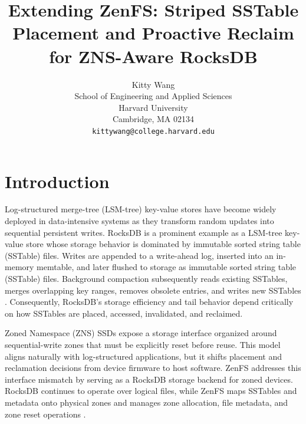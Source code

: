 \documentclass[letterpaper,twocolumn,10pt]{article}
\begin{document}

\date{}

\title{\Large \bf Extending ZenFS: Striped SSTable Placement and Proactive Reclaim for ZNS-Aware RocksDB}

\author{
{\rm Kitty Wang}\\
School of Engineering and Applied Sciences\\
  Harvard University\\
  Cambridge, MA 02134 \\
  \texttt{kittywang@college.harvard.edu} \\
} %

\maketitle


\section{Introduction}
Log-structured merge-tree (LSM-tree) key-value stores have become widely deployed in data-intensive systems as they transform random updates into sequential persistent writes. RocksDB is a prominent example as a LSM-tree key-value store whose storage behavior is dominated by immutable sorted string table (SSTable) files. Writes are appended to a write-ahead log, inserted into an in-memory memtable, and later flushed to storage as immutable sorted string table (SSTable) files. Background compaction subsequently reads existing SSTables, merges overlapping key ranges, removes obsolete entries, and writes new SSTables \cite{dong2021rocksdb}. Consequently, RocksDB's storage efficiency and tail behavior depend critically on how SSTables are placed, accessed, invalidated, and reclaimed.

Zoned Namespace (ZNS) SSDs expose a storage interface organized around sequential-write zones that must be explicitly reset before reuse. This model aligns naturally with log-structured applications, but it shifts placement and reclamation decisions from device firmware to host software. ZenFS addresses this interface mismatch by serving as a RocksDB storage backend for zoned devices. RocksDB continues to operate over logical files, while ZenFS maps SSTables and metadata onto physical zones and manages zone allocation, file metadata, and zone reset operations \cite{bjorling2021zns,zenfsdocs}.
\end{document}
